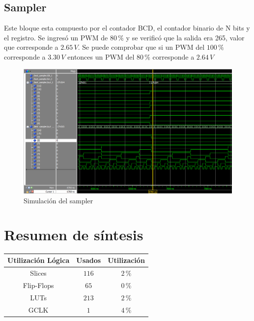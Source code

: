 \documentclass[10pt,spanish,a4paper,openany,notitlepage]{article}
\begin{document}
\subsection{Sampler}

Este bloque esta compuesto por el contador BCD, el contador binario
de N bits y el registro.
Se ingresó un PWM de $80\,\unit{\%}$ y se verificó que la salida era
265, valor que corresponde a $2.65\,\unit{V}$. Se puede comprobar que
si un PWM del $100\,\unit{\%}$ corresponde a $3.30\,\unit{V}$ entonces
un PWM del $80\,\unit{\%}$ corresponde a $2.64\,\unit{V}$

\begin{figure}[H] %
\begin{center}
\includegraphics[scale=0.5]{./imagenes/sampler_test.png}
\caption{Simulación del sampler}
 \label{fig:sim_sampler}
\end{center}
\end{figure}


\section{Resumen de síntesis}

\begin{center}
\begin{tabular}{|c|c|c|}\hline
Utilización Lógica & Usados & Utilización \\\hline
Slices & $116$ & $2\, \unit{\%}$ \\\hline
Flip-Flops & $65$ & $0\, \unit{\%}$ \\\hline
LUTs & $213$ & $2\, \unit{\%}$ \\\hline
GCLK  & $1$ & $4\, \unit{\%}$ \\\hline
\end{tabular}
\end{center}
\end{document}
